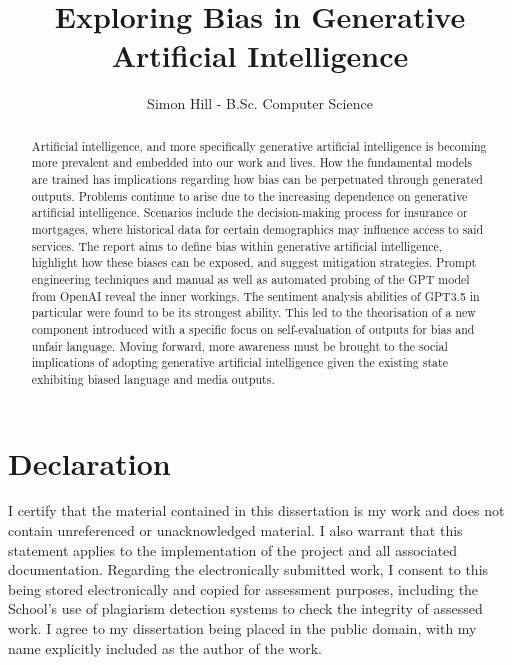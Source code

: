 \documentclass[12pt]{article}
\title{Exploring Bias in Generative Artificial Intelligence}
\author{Simon Hill - B.Sc. Computer Science}
\begin{document}
\maketitle

\newpage

\begin{abstract}

Artificial intelligence, and more specifically generative artificial intelligence is becoming more prevalent and embedded into our work and lives. How the fundamental models are trained has implications regarding how bias can be perpetuated through generated outputs. Problems continue to arise due to the increasing dependence on generative artificial intelligence. Scenarios include the decision-making process for insurance or mortgages, where historical data for certain demographics may influence access to said services. The report aims to define bias within generative artificial intelligence, highlight how these biases can be exposed, and suggest mitigation strategies. Prompt engineering techniques and manual as well as automated probing of the GPT model from OpenAI reveal the inner workings. The sentiment analysis abilities of GPT3.5 in particular were found to be its strongest ability. This led to the theorisation of a new component introduced with a specific focus on self-evaluation of outputs for bias and unfair language. Moving forward, more awareness must be brought to the social implications of adopting generative artificial intelligence given the existing state exhibiting biased language and media outputs.

\end{abstract}

\newpage

\section*{Declaration}
I certify that the material contained in this dissertation is my work and does not
contain unreferenced or unacknowledged material. I also warrant that this statement applies to the implementation of the project and all associated documentation. Regarding the electronically submitted work, I consent to this being stored electronically and copied for assessment purposes, including the School’s use of plagiarism detection systems to check the integrity of assessed work. I agree to my dissertation being placed in the public domain, with my name explicitly included as the author of the work.
\end{document}

